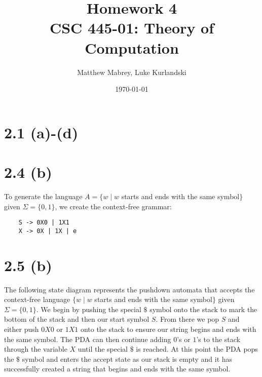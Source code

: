 \documentclass{article}
\title{Homework 4\\[0.2em]\smaller{}CSC 445-01: Theory of Computation}
\author{Matthew Mabrey, Luke Kurlandski}
\date{\today}
\begin{document}
\maketitle

\section*{2.1 (a)-(d)}

\section*{2.4 (b)}
    To generate the language $A = \{w \mid w$ starts and ends with the same symbol$\}$ given $\Sigma = \{0, 1\}$, we create the context-free grammar:
    
\begin{center}
    
    \begin{lstlisting}
    S -> 0X0 | 1X1
    X -> 0X | 1X | e
    \end{lstlisting}
    
\end{center}

\newpage
\section*{2.5 (b)}

The following state diagram represents the pushdown automata that accepts the context-free language $\{w \mid w$ starts and ends with the same symbol$\}$ given $\Sigma = \{0, 1\}$. We begin by pushing the special $\$$ symbol onto the stack to mark the bottom of the stack and then our start symbol $S$. From there we pop $S$ and either push $0X0$ or $1X1$ onto the stack to ensure our string begins and ends with the same symbol. The PDA can then continue adding $0$'s or $1$'s to the stack through the variable $X$ until the special $\$$ is reached. At this point the PDA pops the $\$$ symbol and enters the accept state as our stack is empty and it has successfully created a string that begins and ends with the same symbol.
\end{document}
